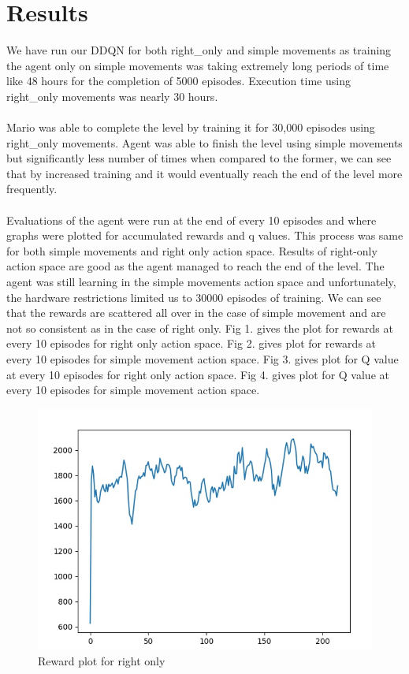\documentclass[conference]{IEEEtran}
\theoremstyle{definition}
\begin{document}
\section{Results}
We have run our DDQN for both right\_only and simple movements as training the agent only on simple movements was taking extremely long periods of time like 48 hours for the completion of 5000 episodes. Execution time using right\_only movements was nearly 30 hours. 
\\
\\
Mario was able to complete the level by training it for 30,000 episodes using right\_only movements. Agent was able to finish the level using simple movements but significantly less number of times when compared to the former, we can see that by increased training and it would eventually reach the end of the level more frequently.
\\
\\
Evaluations of the agent were run at the end of every 10 episodes and where graphs were plotted for accumulated rewards and q values. This process was same for both simple movements and right only action space. Results of right-only action space are good as the agent managed to reach the end of the level. The agent was still learning in the simple movements action space and unfortunately, the hardware restrictions limited us to 30000 episodes of training. We can see that the rewards are scattered all over in the case of simple movement and are not so consistent as in the case of right only.
Fig 1. gives the plot for rewards at every 10 episodes for right only action space.
Fig 2. gives plot for rewards at every 10 episodes for simple movement action space.
Fig 3. gives plot for Q value at every 10 episodes for right only action space.
Fig 4. gives plot for Q value at every 10 episodes for simple movement action space.
\begin{figure}
    \centering
    \includegraphics[width=.90\linewidth] {right_only}
    \caption{Reward plot for right only}
    \label{fig:my_label}
\end{figure}
\end{document}
